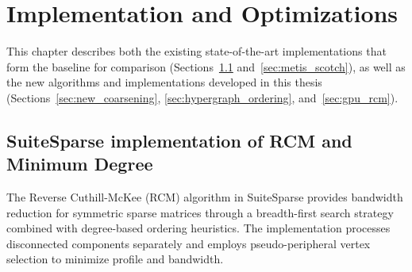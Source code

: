 \chapter{Implementation and Optimizations}
\label{ch:implementation_and_optimizations}

This chapter describes both the existing state-of-the-art implementations that form the baseline for comparison (Sections~\ref{sec:suitesparse} and~\ref{sec:metis_scotch}), as well as the new algorithms and implementations developed in this thesis (Sections~\ref{sec:new_coarsening}, \ref{sec:hypergraph_ordering}, and~\ref{sec:gpu_rcm}).

\section{SuiteSparse implementation of RCM and Minimum Degree}
\label{sec:suitesparse}

The Reverse Cuthill-McKee (RCM) algorithm in SuiteSparse \cite{davis_drtimothyaldendavissuitesparse_2025, noauthor_aldenmath_nodate} provides bandwidth reduction for symmetric sparse matrices through a breadth-first search strategy combined with degree-based ordering heuristics. The implementation processes disconnected components separately and employs pseudo-peripheral vertex selection to minimize profile and bandwidth.

